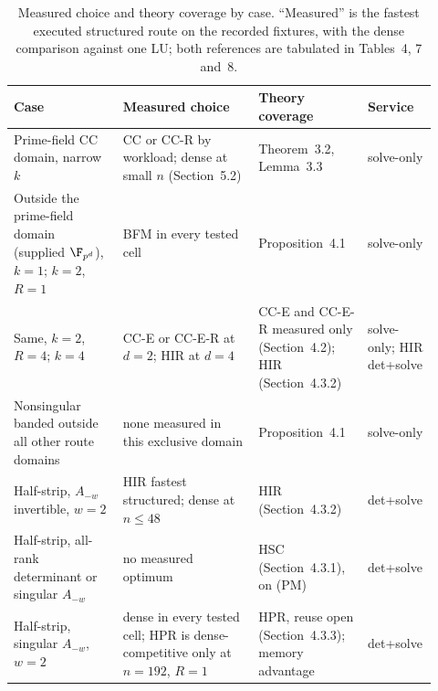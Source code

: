 \begin{table}[p]
\caption{Measured choice and theory coverage by case.  ``Measured'' is the
fastest executed structured route on the recorded fixtures, with the dense
comparison against one LU; both references are tabulated in
Tables~4, 7
and~8.}

\centering\small
\begin{tabular}{@{}>{\raggedright\arraybackslash}p{0.25\linewidth}>{\raggedright\arraybackslash}p{0.31\linewidth}>{\raggedright\arraybackslash}p{0.25\linewidth}>{\raggedright\arraybackslash}p{0.11\linewidth}@{}}
\hline
Case & Measured choice & Theory coverage & Service \\
\hline
Prime-field CC domain, narrow $k$ &
CC or CC-R by workload; dense at small $n$ (Section~5.2) &
Theorem~3.2, Lemma~3.3 & solve-only \\
Outside the prime-field domain (supplied $\F_{p^d}$), $k=1$; $k=2$, $R=1$ &
BFM in every tested cell &
Proposition~4.1 & solve-only \\
Same, $k=2$, $R=4$; $k=4$ &
CC-E or CC-E-R at $d=2$; HIR at $d=4$ &
CC-E and CC-E-R measured only (Section~4.2); HIR (Section~4.3.2) & solve-only; HIR det+solve \\
Nonsingular banded outside all other route domains &
none measured in this exclusive domain &
Proposition~4.1 & solve-only \\
Half-strip, $A_{-w}$ invertible, $w=2$ &
HIR fastest structured; dense at $n\le48$ &
HIR (Section~4.3.2) & det+solve \\
Half-strip, all-rank determinant or singular $A_{-w}$ &
no measured optimum &
HSC (Section~4.3.1), on (PM) & det+solve \\
Half-strip, singular $A_{-w}$, $w=2$ &
dense in every tested cell; HPR is dense-competitive only at $n=192$, $R=1$ &
HPR, reuse open (Section~4.3.3); memory advantage & det+solve \\
\hline
\end{tabular}
\end{table}
